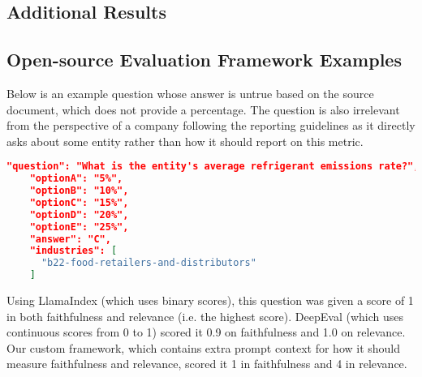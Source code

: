 
\begin{appendices}

\chapter{Additional Results} \label{appxa}

\section{Open-source Evaluation Framework Examples}

Below is an example question whose answer is untrue based on the source document, which does not provide a percentage. The question is also irrelevant from the perspective of a company following the reporting guidelines as it directly asks about some entity rather than how it should report on this metric.

\begin{lstlisting}[language=json,firstnumber=1,label={lst:opensource_eval},caption={Sample MCQ generated using the baseline prompt method}]
"question": "What is the entity's average refrigerant emissions rate?",
    "optionA": "5%",
    "optionB": "10%",
    "optionC": "15%",
    "optionD": "20%",
    "optionE": "25%",
    "answer": "C",
    "industries": [
      "b22-food-retailers-and-distributors"
    ]
\end{lstlisting}

Using LlamaIndex (which uses binary scores), this question was given a score of 1 in both faithfulness and relevance (i.e. the highest score). DeepEval (which uses continuous scores from 0 to 1) scored it 0.9 on faithfulness and 1.0 on relevance. Our custom framework, which contains extra prompt context for how it should measure faithfulness and relevance, scored it 1 in faithfulness and 4 in relevance.


\end{appendices}
